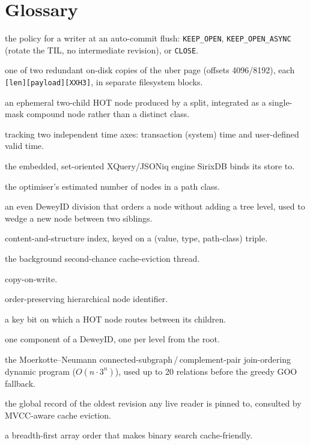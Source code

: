 \documentclass[11pt,a4paper,oneside]{report}
\theoremstyle{sirixthm}
\newcommand{\code}[1]{\texttt{#1}}
\begin{document}
\section{Glossary}
\label{app:glossary}


\begin{description}[leftmargin=0pt,style=nextline,font=\bfseries\sffamily\color{slate}]
\item[AfterCommitState] the policy for a writer at an auto-commit flush: \code{KEEP\_OPEN},
  \code{KEEP\_OPEN\_ASYNC} (rotate the TIL, no intermediate revision), or \code{CLOSE}.
\item[Beacon] one of two redundant on-disk copies of the uber page (offsets 4096/8192), each
  \code{[len][payload][XXH3]}, in separate filesystem blocks.
\item[BiNode] an ephemeral two-child HOT node produced by a split, integrated as a single-mask
  compound node rather than a distinct class.
\item[Bitemporal] tracking two independent time axes: transaction (system) time and user-defined
  valid time.
\item[Brackit] the embedded, set-oriented XQuery/JSONiq engine SirixDB binds its store to.
\item[Cardinality] the optimiser's estimated number of nodes in a path class.
\item[Caret] an even DeweyID division that orders a node without adding a tree level, used to wedge a
  new node between two siblings.
\item[CAS index] content-and-structure index, keyed on a (value, type, path-class) triple.
\item[Clock sweeper] the background second-chance cache-eviction thread.
\item[CoW] copy-on-write.
\item[DeweyID] order-preserving hierarchical node identifier.
\item[Discriminative bit] a key bit on which a HOT node routes between its children.
\item[Division] one component of a DeweyID, one per level from the root.
\item[DPhyp] the Moerkotte--Neumann connected-subgraph\,/\,complement-pair join-ordering dynamic
  program ($O(n\cdot 3^n)$), used up to 20 relations before the greedy GOO fallback.
\item[Epoch tracker] the global record of the oldest revision any live reader is pinned to, consulted
  by MVCC-aware cache eviction.
\item[Eytzinger layout] a breadth-first array order that makes binary search cache-friendly.

\end{description}
\end{document}
